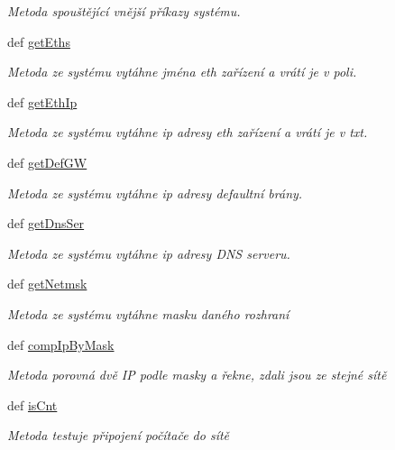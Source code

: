 \begin{DoxyCompactItemize}
\begin{DoxyCompactList}\small\item\em Metoda spouštějící vnější příkazy systému. \end{DoxyCompactList}\item 
def \hyperlink{classConsSys_1_1ConsSys_a5bd98412b24730939bdfc10033ae0b51}{get\-Eths}
\begin{DoxyCompactList}\small\item\em Metoda ze systému vytáhne jména eth zařízení a vrátí je v poli. \end{DoxyCompactList}\item 
def \hyperlink{classConsSys_1_1ConsSys_a9d9dce75471df6c59b12c8e440e849d5}{get\-Eth\-Ip}
\begin{DoxyCompactList}\small\item\em Metoda ze systému vytáhne ip adresy eth zařízení a vrátí je v txt. \end{DoxyCompactList}\item 
def \hyperlink{classConsSys_1_1ConsSys_ab56242cf1d07da89a1bbdad369926f77}{get\-Def\-G\-W}
\begin{DoxyCompactList}\small\item\em Metoda ze systému vytáhne ip adresy defaultní brány. \end{DoxyCompactList}\item 
def \hyperlink{classConsSys_1_1ConsSys_aa4f9f92600aab89b6a70e72dbef258ee}{get\-Dns\-Ser}
\begin{DoxyCompactList}\small\item\em Metoda ze systému vytáhne ip adresy D\-N\-S serveru. \end{DoxyCompactList}\item 
def \hyperlink{classConsSys_1_1ConsSys_a73714b34e9344c67d2a9328f270376aa}{get\-Netmsk}
\begin{DoxyCompactList}\small\item\em Metoda ze systému vytáhne masku daného rozhraní \end{DoxyCompactList}\item 
def \hyperlink{classConsSys_1_1ConsSys_a1ef224020294732e42b40e7ee5664d34}{comp\-Ip\-By\-Mask}
\begin{DoxyCompactList}\small\item\em Metoda porovná dvě I\-P podle masky a řekne, zdali jsou ze stejné sítě \end{DoxyCompactList}\item 
def \hyperlink{classConsSys_1_1ConsSys_ab9af30415a18ef366860ab040eacb8e8}{is\-Cnt}
\begin{DoxyCompactList}\small\item\em Metoda testuje připojení počítače do sítě \end{DoxyCompactList}\item 

\end{DoxyCompactItemize}
